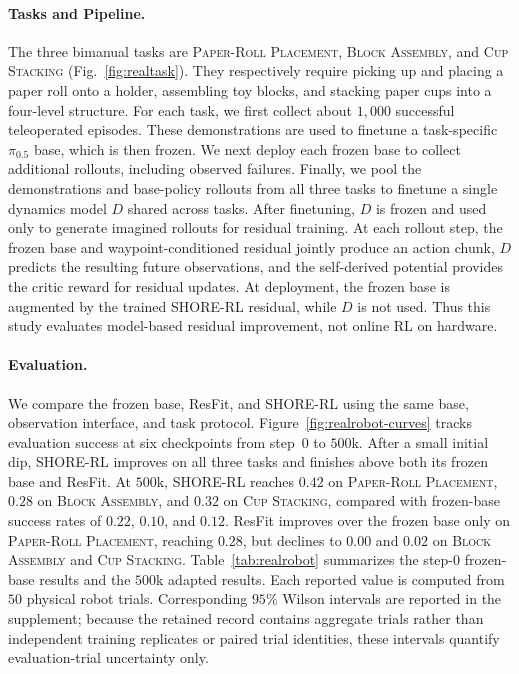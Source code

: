 \documentclass[letterpaper]{article} %
\begin{document}
\paragraph{Tasks and Pipeline.}
The three bimanual tasks are \textsc{Paper-Roll Placement}, \textsc{Block
Assembly}, and \textsc{Cup Stacking} (Fig.~\ref{fig:realtask}). They
respectively require picking up and placing a paper roll onto a holder,
assembling toy blocks, and stacking paper cups into a four-level structure.
For each task,
we first collect about $1{,}000$ successful teleoperated episodes. These
demonstrations are used to finetune a task-specific $\pi_{0.5}$ base, which is
then frozen. We next deploy each frozen base to collect additional rollouts,
including observed failures. Finally, we pool the demonstrations and
base-policy rollouts from all three tasks to finetune a single dynamics model
$D$ shared across tasks. After
finetuning, $D$ is frozen and used only to generate imagined rollouts for
residual training. At each rollout step, the frozen base and
waypoint-conditioned residual jointly produce an action chunk, $D$ predicts
the resulting future observations, and the self-derived potential provides the
critic reward for residual updates. At deployment, the frozen base is
augmented by the trained SHORE-RL residual, while $D$ is not used. Thus this
study evaluates model-based residual improvement, not online RL on hardware.

\paragraph{Evaluation.}
We compare the frozen base, ResFit, and SHORE-RL using the same base,
observation interface, and task protocol.
Figure~\ref{fig:realrobot-curves} tracks evaluation success at six checkpoints
from step~$0$ to $500$k. After a small initial dip, SHORE-RL improves on all
three tasks and finishes above both its frozen base and ResFit. At $500$k,
SHORE-RL reaches $0.42$ on \textsc{Paper-Roll Placement}, $0.28$ on
\textsc{Block Assembly}, and $0.32$ on \textsc{Cup Stacking}, compared with
frozen-base success rates of $0.22$, $0.10$, and $0.12$. ResFit improves over the
frozen base only on \textsc{Paper-Roll Placement}, reaching $0.28$, but declines
to $0.00$ and $0.02$ on \textsc{Block Assembly} and \textsc{Cup Stacking}.
Table~\ref{tab:realrobot} summarizes the step-$0$ frozen-base results and the
$500$k adapted results. Each reported value is computed from $50$ physical
robot trials. Corresponding $95\%$ Wilson intervals are reported in the
supplement; because the retained record contains aggregate trials rather than
independent training replicates or paired trial identities, these intervals
quantify evaluation-trial uncertainty only.
\end{document}

